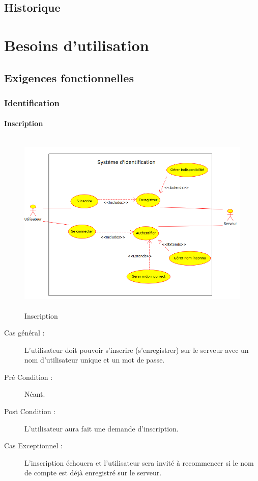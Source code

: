\documentclass[a4paper]{article}
\begin{document}
\printglossary[numberedsection]
\subsection{Historique}

\section{Besoins d'utilisation}
\subsection{Exigences fonctionnelles}

\subsubsection{Identification}
\paragraph{Inscription}
\begin{figure}[h]
   \caption{\label{1} Inscription}
   \begin{center}
   \includegraphics[height=250pt]{uml/id.png}
   \end{center}
\end{figure}
\begin{description}
\item[Cas général :] L'\gls{utilisateur} doit pouvoir s'inscrire (s'enregistrer) sur le \gls{serveur} avec un nom d'\gls{utilisateur} unique et un mot de passe.
\item[Pré Condition  :] Néant.
\item[Post Condition :] L'\gls{utilisateur} aura fait une demande d'inscription.
\item[Cas Exceptionnel :] L'inscription échouera et l'\gls{utilisateur} sera invité à recommencer si le nom de compte est déjà enregistré sur le \gls{serveur}.
\end{description}
\end{document}
